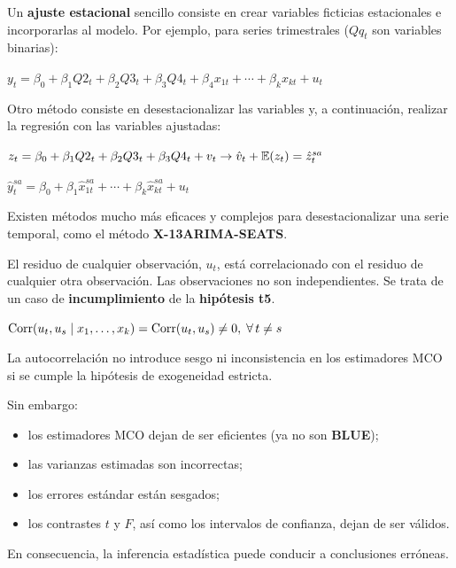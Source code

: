\begin{f}[Estacionalidad]
	Un \textbf{ajuste estacional} sencillo consiste en crear variables ficticias estacionales e incorporarlas al modelo. Por ejemplo, para series trimestrales (\(Qq_t\) son variables binarias):
	
	\begin{center}
		\(y_{t}=\beta_{0}+\beta_{1}Q2_{t}+\beta_{2}Q3_{t}+\beta_{3}Q4_{t}+\beta_{4}x_{1t}+\cdots+\beta_{k}x_{kt}+u_{t}\)
	\end{center}
	
	Otro método consiste en desestacionalizar las variables y, a continuación, realizar la regresión con las variables ajustadas:
	
	\begin{center}
		\(z_{t}=\beta_{0}+\beta_{1}Q2_{t}+\beta_{2}Q3_{t}+\beta_{3}Q4_{t}+v_{t}\rightarrow\hat{v}_{t}+\mathbb{E}(z_{t})=\hat{z}_{t}^{sa}\)
		
		\(\hat{y}_{t}^{sa}=\beta_{0}+\beta_{1}\hat{x}_{1t}^{sa}+\cdots+\beta_{k}\hat{x}_{kt}^{sa}+u_{t}\)
	\end{center}
	
	Existen métodos mucho más eficaces y complejos para desestacionalizar una serie temporal, como el método \textbf{X-13ARIMA-SEATS}.
	
\end{f}

\begin{f}[Autocorrelación]
	
	El residuo de cualquier observación, \(u_t\), está correlacionado con el residuo de cualquier otra observación. Las observaciones no son independientes. Se trata de un caso de \textbf{incumplimiento} de la \textbf{hipótesis t5}.
	
	\begin{center}
		\(\mathrm{Corr}(u_{t},u_{s}\mid x_{1},\ldots,x_{k})=\mathrm{Corr}(u_{t},u_{s})\neq0,\;\forall\,t\neq s\)
	\end{center}
	
\end{f}    
\begin{f}
	
	La autocorrelación no introduce sesgo ni inconsistencia en los estimadores MCO si se cumple la hipótesis de exogeneidad estricta.
	
	Sin embargo:
	
	\begin{itemize}[leftmargin=*]
		\item los estimadores MCO dejan de ser eficientes (ya no son \textbf{BLUE});
		\item las varianzas estimadas son incorrectas;
		\item los errores estándar están sesgados;
		\item los contrastes \(t\) y \(F\), así como los intervalos de confianza, dejan de ser válidos.
	\end{itemize}
	
	En consecuencia, la inferencia estadística puede conducir a conclusiones erróneas.
	
\end{f}  

